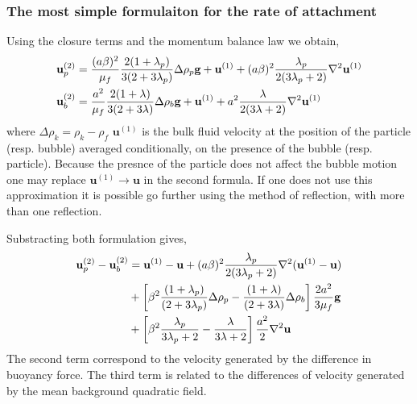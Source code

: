 \documentclass[12pt]{My_preprint}
\begin{document}
\subsubsection{The most simple formulaiton for the rate of attachment}
Using the closure terms and the momentum balance law we obtain, 
\begin{align}
    \textbf{u}_p^{(2)} 
    &=
    \frac{(a\beta)^2}{\mu_f}
    \frac{2(1+\lambda_p)}{3(2+3\lambda_p)}\Delta\rho_p\textbf{g}
    + \textbf{u}^{(1)}
    + (a\beta)^2 \frac{\lambda_p}{2(3\lambda_p +2)} \mathbf{\nabla}^2 \textbf{u}^{(1)}\\
    \textbf{u}_b^{(2)} 
    &=
    \frac{a^2}{\mu_f}
    \frac{2(1+\lambda)}{3(2+3\lambda)}\Delta\rho_b\textbf{g}
    + \textbf{u}^{(1)}
    + a^2 \frac{\lambda}{2(3\lambda +2)} \mathbf{\nabla}^2 \textbf{u}^{(1)}
\end{align}
where $\Delta\rho_k = \rho_k - \rho_f$ $\textbf{u}^{(1)}$ is the bulk fluid velocity at the position of the particle (resp. bubble) averaged conditionally, on the presence of the bubble (resp. particle). 
Because the presnce of the particle does not affect the bubble motion one may replace $\textbf{u}^{(1)} \to \textbf{u}$ in the second formula.
If one does not use this approximation it is possible go further using the method of reflection, with more than one reflection.  

Substracting both formulation gives, 
\begin{align}
    \textbf{u}_p^{(2)} - \textbf{u}_b^{(2)}
    &=
    \textbf{u}^{(1)} - \textbf{u}
    + (a\beta)^2 \frac{\lambda_p}{2(3\lambda_p +2)} \mathbf{\nabla}^2 (\textbf{u}^{(1)} - \textbf{u})\\
    &+
    \left[\beta^2\frac{(1+\lambda_p)}{(2+3\lambda_p)}\Delta\rho_p  -\frac{(1+\lambda)}{(2+3\lambda)}\Delta\rho_b  \right] \frac{2a^2}{3\mu_f}\textbf{g}\\
    &+ \left[\beta^2\frac{\lambda_p}{3\lambda_p +2} - \frac{\lambda}{3\lambda +2} \right] \frac{a^2}{2}\mathbf{\nabla}^2 \textbf{u}
\end{align}
The second term correspond to the velocity generated by the difference in buoyancy force. 
The third term is related to the differences of velocity generated by the mean background quadratic field. 
\end{document}

